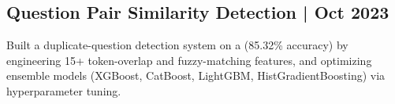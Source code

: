 \documentclass[]{deedy-resume-openfont}
\begin{document}
\begin{minipage}[t]{0.66\textwidth}
\subsection{Question Pair Similarity Detection | Oct 2023}
Built a duplicate-question detection system on a  (85.32\% accuracy) by engineering 15+ token-overlap and fuzzy-matching features, and optimizing ensemble models (XGBoost, CatBoost, LightGBM, HistGradientBoosting) via hyperparameter tuning.
\sectionsep

\end{minipage}
\end{document}

